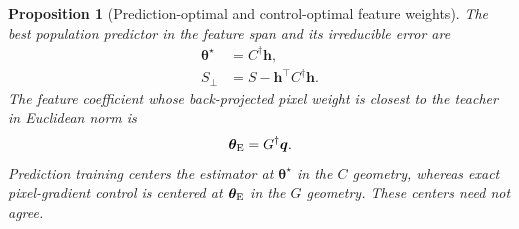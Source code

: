 \documentclass[11pt]{article}
\newtheorem{proposition}[theorem]{Proposition}
\newcommand{\tstar}{\bm\theta^{\star}}
\begin{document}
\begin{proposition}[Prediction-optimal and control-optimal feature weights]
\label{prop:two-centers}
The best population predictor in the feature span and its irreducible error
are
\begin{align}
  \tstar&=C^{\dagger}\bm h,\label{eq:theta-p}\\
  S_{\perp}&=S-\bm h^{\top}C^{\dagger}\bm h.\label{eq:sperp}
\end{align}
The feature coefficient whose back-projected pixel weight is closest to the
teacher in Euclidean norm is
\begin{equation}
  \bm\theta_{\rm E}=G^{\dagger}\bm q.
  \label{eq:theta-e}
\end{equation}
Prediction training centers the estimator at $\tstar$ in the $C$ geometry,
whereas exact pixel-gradient control is centered at $\bm\theta_{\rm E}$ in the
$G$ geometry. These centers need not agree.
\end{proposition}
\end{document}
